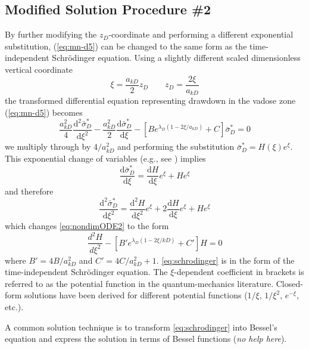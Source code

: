 \documentclass[12pt,letterpaper]{article}
\begin{document}
\subsection{Modified Solution Procedure \#2} 
By further modifying the $z_D$-coordinate and performing a different exponential substitution, (\ref{eq:mn-d5}) can be changed to the same form as the time-independent Schr\"{o}dinger equation.  Using a slightly different scaled dimensionless vertical coordinate 
\begin{equation}\nonumber
 \xi= \frac{a_{kD}}{2} z_D \qquad z_D=\frac{2\xi}{a_{kD}} 
\end{equation}
the transformed differential equation representing drawdown in the vadose zone (\ref{eq:mn-d5}) becomes
\begin{equation}
  \label{eq:nondimODE2}
  \frac{a_{kD}^2}{4} \frac{\mathrm{d}^2
    \bar{\sigma}_D^{\ast}}{\mathrm{d}\xi^2} - \frac{a_{kD}^2}{2}
  \frac{\mathrm{d} \bar{\sigma}_D^{\ast}}{\mathrm{d}\xi} - \left[
    B e^{\lambda_D (1-2\xi/a_{kD})} + C\right] \bar{\sigma}_D^{\ast}=0
\end{equation}
we multiply through by $4/a_{kD}^2$ and performing the substitution $\bar{\sigma}^{\ast}_{D} = H(\xi) e^\xi$.  This exponential change of variables (e.g., see \cite{kuhlman2008quasilinear}) implies
\begin{equation}
  \nonumber
  \frac{\mathrm{d} \bar{\sigma}^{\ast}_{D}}{\mathrm{d} \xi} = \frac{\mathrm{d}H}{\mathrm{d}\xi} e^\xi + H e^\xi  
\end{equation}
and therefore
\begin{equation}
  \nonumber
  \frac{\mathrm{d}^2 \bar{\sigma}^{\ast}_{D}}{\mathrm{d} \xi^2} = \frac{\mathrm{d}^2H}{\mathrm{d}\xi^2} e^\xi + 2\frac{\mathrm{d}H}{\mathrm{d}\xi} e^\xi + He^\xi  
\end{equation}
which changes \eqref{eq:nondimODE2} to the form
\begin{equation}
  \label{eq:schrodinger}
  \frac{d^2 H}{d \xi^2} - \left[B' e^{\lambda_D (1-2\xi/{kD})} + C' \right]H = 0
\end{equation}
where $B' = 4B/a_{kD}^2$ and $C'=4C/a_{kD}^2 + 1$.  \eqref{eq:schrodinger} is in the form of the time-independent Schr\"{o}dinger equation.  The $\xi$-dependent coefficient in brackets is referred to as the potential function in the quantum-mechanics literature.  Closed-form solutions have been derived for different potential functions ($1/\xi$, $1/\xi^2$, $e^{-\xi}$, etc.).  

A common solution technique is to transform \eqref{eq:schrodinger} into Bessel's equation and express the solution in terms of Bessel functions (\textit{no help here}).
\end{document}
